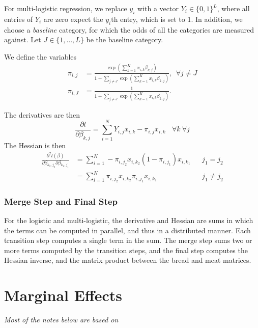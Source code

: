 For multi-logistic regression,  we replace $y_i$ with a vector $Y_i \in \{0,1\}^L$, where all entries of $Y_i$ are zero expect the $y_i$th entry, which is set to 1.  In addition, we choose a \textit{baseline} category, for which the odds of all the categories are measured against.  Let $J \in \{1, \dots, L \}$ be the baseline category.

We define the variables
\begin{align}
\pi_{i,j} &= \frac{\exp\left(\sum_{k=1}^K x_{i,k} \beta_{k,j} \right)}{1 + \sum_{j\ne J} \exp \left(\sum_{k=1}^K x_{i,k} \beta_{k,j} \right)}, \ \ \forall j \ne J\\
\pi_{i,J} &= \frac{1}{1 + \sum_{j\ne J} \exp \left(\sum_{k=1}^K x_{i,k} \beta_{k,j} \right)}.
\end{align}

The derivatives are then
\begin{equation}\label{eq:first_derivative2}
\frac{\partial l}{\partial \beta_{k,j}} = \sum_{i=1}^{N} Y_{i,j}x_{i,k} - \pi_{i,j}x_{i,k} \ \ \ \ \forall k \  \forall j
\end{equation}
The Hessian is then
\begin{align}\label{eq:second_derivative2}
\frac{\partial^2 l({\beta})}{\partial \beta_{k_2,j_2} \partial \beta_{k_1,j_1}}
&= \sum_{i=1}^{N} -\pi_{i,j_2}x_{i,k_2}(1-\pi_{i,j_1})x_{i,k_1} &&j_1 = j_2 \\
&= \sum_{i=1}^{N} \pi_{i,j_2}x_{i,k_2}\pi_{i,j_1}x_{i,k_1} &&j_1 \neq j_2
\end{align}

\subsubsection{Merge Step and Final Step}

For the logistic and multi-logistic, the derivative and Hessian are sums in
which the terms can be computed in parallel, and thus in a distributed manner.
Each transition step computes a single term in the sum.  The merge step sums two
or more terms computed by the transition steps, and the final step computes the
Hessian inverse, and the matrix product between the bread and meat matrices.


\section{Marginal Effects} %
\label{sub:marginal_effects}
\textit{Most of the notes below are based on~\cite{diekmann2008}}

